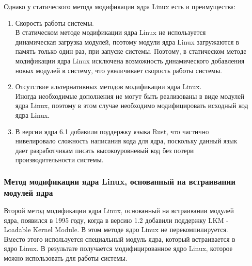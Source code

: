 Однако у статического метода модификации ядра Linux есть и преимущества:

\begin{enumerate}
    \item Скорость работы системы. \vspace{1mm}\\
    В статическом методе модификации ядра Linux не используется динамическая загрузка модулей, поэтому модули ядра Linux загружаются в память только один раз, при запуске системы.
    Поэтому, в статическом методе модификации ядра Linux исключена возможность динамического добавления новых модулей в систему, что увеличивает скорость работы системы.
    \item Отсутствие альтернативных методов модификации ядра Linux.\vspace{1mm}\\
    Иногда необходимые дополнения не могут быть реализованы в виде модулей ядра Linux, поэтому в этом случае необходимо модифицировать исходный код ядра Linux.
    \item В версии ядра 6.1 добавили поддержку языка Rust, что частично нивелировало сложность написания кода для ядра, поскольку данный язык дает разработчикам писать высокоуровневый код без потери производительности системы.
\end{enumerate}

\subsubsection{Метод модификации ядра Linux, основанный на встраивании модулей ядра}\label{subsec:---linux-----}

Второй метод модификации ядра Linux, основанный на встраивании модулей ядра, появился в 1995 году, когда в версию 1.2 добавили поддержку LKM - Loadable Kernel Module.
В этом методе ядро Linux не перекомпилируется.
Вместо этого используется специальный модуль ядра, который встраивается в ядро Linux.
В результате получается модифицированное ядро Linux, которое можно использовать для работы системы.

